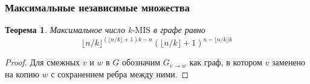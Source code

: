 \documentclass[12pt]{article}
\newtheorem{theorem}{Теорема}
\begin{document}
\subsubsection{Максимальные независимые множества}
\begin{theorem}\cite{brics}\label{th:max_k_MIS}
Максимальное число k-$\text{MIS}$ в графе равно
\begin{equation}\label{eq:exact_bound}
    {\lfloor n/k \rfloor}^{\left( \lfloor n/k \rfloor + 1\right)k - n}\left(\lfloor n/k \rfloor + 1\right)^{n - \lfloor n/k \rfloor k}
\end{equation}
\end{theorem}
\begin{proof}
	Для смежных $v$ и $w$ в $G$ обозначим $G_{v\to w}$ как граф, в котором $v$ заменено на копию $w$ с сохранением ребра между ними.
	

\end{proof}
\end{document}
